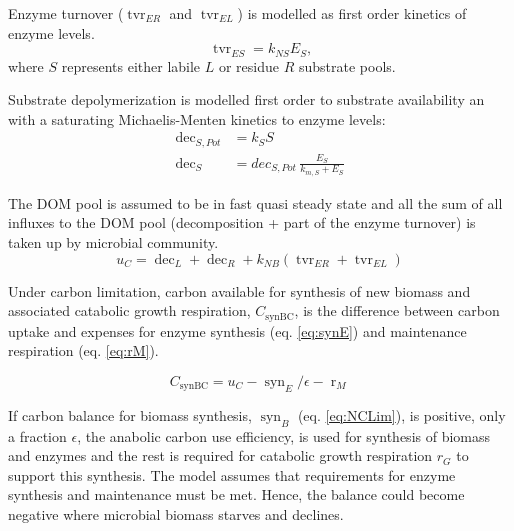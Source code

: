 Enzyme turnover ($\operatorname{tvr}_{ER}$ and $\operatorname{tvr}_{EL}$) is
modelled as first order kinetics of enzyme levels.
\begin{equation}
\label{eq:tvrE}
\operatorname{tvr}_{ES} = k_{NS} E_S \text{,}
\end{equation}
where $S$ represents either labile $L$ or residue $R$ substrate pools.  

% 
Substrate depolymerization is modelled first order to substrate
availability an with a saturating Michaelis-Menten kinetics to enzyme levels:
\begin{subequations}
\label{eq:dec}
\begin{align}
\operatorname{dec}_{S,Pot} &= k_S S
\\ 
\operatorname{dec}_S &= dec_{S,Pot} \, \frac{E_S}{k_{m,S} + E_S}
\end{align}
\end{subequations}
 
The DOM pool is assumed to be in fast quasi steady state and all the sum of all
influxes to the DOM pool (decomposition + part of the enzyme turnover) is taken
up by microbial community.
\begin{equation}
\label{eq:uC}
u_C = \operatorname{dec}_L + \operatorname{dec}_R +  k_{NB}
(\operatorname{tvr}_{ER} + \operatorname{tvr}_{EL})
\end{equation}

Under carbon limitation, carbon available for synthesis of new biomass and
associated catabolic growth respiration, $C_{\operatorname{synBC}}$, is the
difference between carbon uptake and expenses for enzyme synthesis (eq.
\ref{eq:synE}) and maintenance respiration (eq.
\ref{eq:rM}).

\begin{equation}
\label{eq:synBC} 
C_{\operatorname{synBC}} = u_C -
\operatorname{syn}_E/\epsilon - \operatorname{r}_{M}
\end{equation}

If carbon balance for biomass synthesis, $\operatorname{syn}_B$ (eq.
\ref{eq:NCLim}), is positive, only a fraction $\epsilon$, the anabolic
carbon use efficiency, is used for synthesis of biomass and enzymes
and the rest is required for catabolic growth respiration $r_G$ to support this
synthesis.
The model assumes that requirements for enzyme synthesis and maintenance must be
met. Hence, the balance could become negative where microbial biomass starves
and declines.

